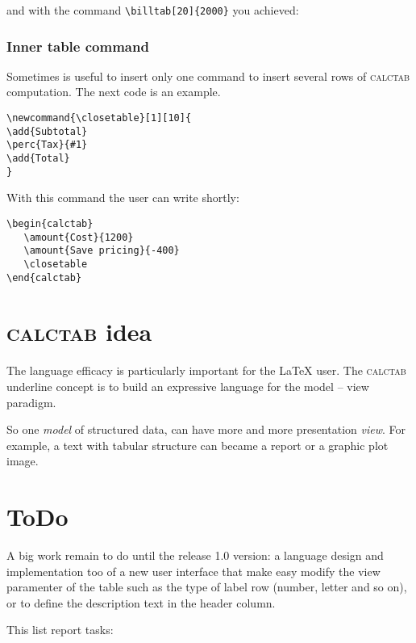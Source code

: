 \documentclass[a4paper]{article}
\newcommand{\ct}{\textsc{calctab}} %
\begin{document}
and with the command \verb=\billtab[20]{2000}= you achieved:


%
%
%
\subsubsection{Inner table command}

Sometimes is useful to insert only one command to insert several rows of \ct{} computation. The next code is an example.

\begin{Verbatim}
\newcommand{\closetable}[1][10]{
\add{Subtotal}
\perc{Tax}{#1}
\add{Total}
}
\end{Verbatim}

With this command the user can write shortly:

\begin{Verbatim}
\begin{calctab}
   \amount{Cost}{1200}
   \amount{Save pricing}{-400}
   \closetable
\end{calctab}
\end{Verbatim}

\begin{calctab}
   \closetable
\end{calctab}



%
%
%
\section{\ct{} idea}
The language efficacy is particularly important for the \LaTeX{} user. The \ct{} underline concept is to build an expressive language for the model -- view paradigm.

So one \emph{model} of structured data, can have more and more presentation \emph{view}. For example, a text with tabular structure can became a report or a graphic plot image.

\section{ToDo}
A big work remain to do until the release 1.0 version: a language design and implementation too of a new user interface that make easy modify the view paramenter of the table such as the type of label row (number, letter and so on), or to define the description text in the header column.


This list report tasks:
\end{document}
